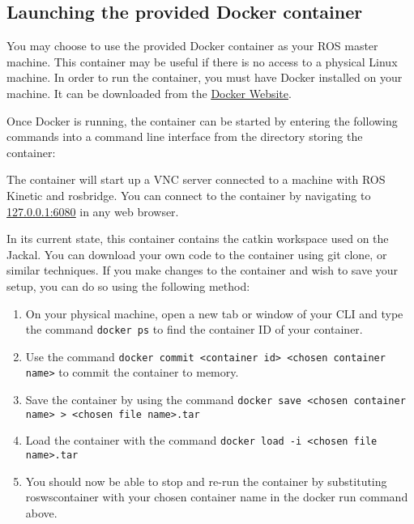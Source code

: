 \documentclass[../main.tex]{subfiles}
\begin{document}
\subsection{Launching the provided Docker container} \label{sec:docker_launch}
You may choose to use the provided Docker container as your ROS master machine. This container may be useful if there is no access to a physical Linux machine. In order to run the container, you must have Docker installed on your machine. It can be downloaded from the \href{https://store.docker.com/search?type=edition&offering=community}{\underline{Docker Website}}.

Once Docker is running, the container can be started by entering the following commands into a command line interface from the directory storing the container:

The container will start up a VNC server connected to a machine with ROS Kinetic and rosbridge. You can connect to the container by navigating to \href{http://127.0.0.1:6080}{\underline{127.0.0.1:6080}} in any web browser.

In its current state, this container contains the catkin workspace used on the Jackal. You can download your own code to the container using git clone, or similar techniques. If you make changes to the container and wish to save your setup, you can do so using the following method:
\begin{enumerate}
    \item On your physical machine, open a new tab or window of your CLI and type the command \texttt{docker ps} to find the container ID of your container.
    \item Use the command \texttt{docker commit <container id> <chosen container name>} to commit the container to memory.
    \item Save the container by using the command \texttt{docker save <chosen container name> > <chosen file name>.tar}
    \item Load the container with the command \texttt{docker load -i <chosen file name>.tar}
    \item You should now be able to stop and re-run the container by substituting roswscontainer with your chosen container name in the docker run command above.
\end{enumerate}
\end{document}
